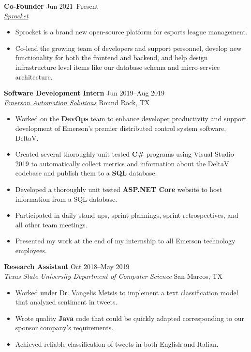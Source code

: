 \documentclass[10pt]{article}
\newcommand{\ressubheading}[4]{
    \textbf{#1} \hfill #2 \\[0pt]
    \textit{#3} \hfill #4 \\[0pt]
}
\newenvironment{resitemize}{
    \vspace{-6pt}
    \begin{itemize}
    \setlength\itemsep{-2pt}
}{
    \end{itemize}
}
\begin{document}
\begin{NoHyper}
\ressubheading
	{Co-Founder}
	{Jun 2021--Present}
	{\href{https://github.com/SprocketBot}{Sprocket}}
	{}
	\begin{resitemize}
        \item Sprocket is a brand new open-source platform for esports league management.
        \item Co-lead the growing team of developers and support personnel, develop new functionality for both the frontend and backend, and help design infrastructure level items like our database schema and micro-service architecture.
	\end{resitemize}
	
\ressubheading
	{Software Development Intern}
	{Jun 2019--Aug 2019}
	{\href{https://www.emerson.com/en-us/automation-solutions}{Emerson Automation Solutions}}
	{Round Rock, TX}
    \begin{resitemize}
        \item Worked on the \textbf{DevOps} team to enhance developer productivity and support development of Emerson's premier distributed control system software, DeltaV.
        \item Created several thoroughly unit tested \textbf{C\#} programs using Visual Studio 2019 to automatically collect metrics and information about the DeltaV codebase and publish them to a \textbf{SQL} database.
        \item Developed a thoroughly unit tested \textbf{ASP.NET Core} website to host information from a SQL database.
        \item Participated in daily stand-ups, sprint plannings, sprint retrospectives, and all other team meetings.
        \item Presented my work at the end of my internship to all Emerson technology  employees.
    \end{resitemize}

\ressubheading
	{Research Assistant}
	{Oct 2018--May 2019}
	{Texas State University Department of Computer Science}
	{San Marcos, TX}
    \begin{resitemize}
    	\item Worked under Dr. Vangelis Metsis to implement a text classification model that analyzed sentiment in tweets.
    	\item Wrote quality \textbf{Java} code that could be quickly adapted corresponding to our sponsor company's requirements.
        \item Achieved reliable classification of tweets in both English and Italian.
    \end{resitemize}


\end{NoHyper}
\end{document}
